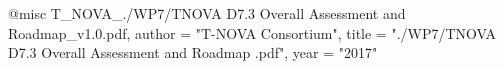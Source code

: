 @misc{ T_NOVA_./WP7/TNOVA D7.3 Overall Assessment and Roadmap_v1.0.pdf,
       author = "T-NOVA Consortium",
       title = "./WP7/TNOVA D7.3 Overall Assessment and Roadmap .pdf",
       year = "2017" }
